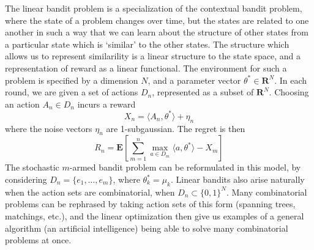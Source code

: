 The linear bandit problem is a specialization of the contextual bandit problem, where the state of a problem changes over time, but the states are related to one another in such a way that we can learn about the structure of other states from a particular state which is `similar' to the other states. The structure which allows us to represent similarility is a linear structure to the state space, and a representation of reward as a linear functional. The environment for such a problem is specified by a dimension $N$, and a parameter vector $\theta^* \in \mathbf{R}^N$. In each round, we are given a set of actions $D_n$, represented as a subset of $\mathbf{R}^N$. Choosing an action $A_n \in D_n$ incurs a reward
%
\[ X_n = \langle A_n, \theta^* \rangle + \eta_n \]
%
where the noise vectors $\eta_n$ are 1-subgaussian. The regret is then
%
\[ R_n = \mathbf{E} \left[ \sum_{m = 1}^n \max_{a \in D_m} \langle a, \theta^* \rangle - X_m \right] \]
%
The stochastic $m$-armed bandit problem can be reformulated in this model, by considering $D_n = \{ e_1, \dots, e_m \}$, where $\theta^*_k = \mu_k$. Linear bandits also arise naturally when the action sets are combinatorial, when $D_n \subset \{ 0, 1 \}^N$. Many combinatorial problems can be rephrased by taking action sets of this form (spanning trees, matchings, etc.), and the linear optimization then give us examples of a general algorithm (an artificial intelligence) being able to solve many combinatorial problems at once.

